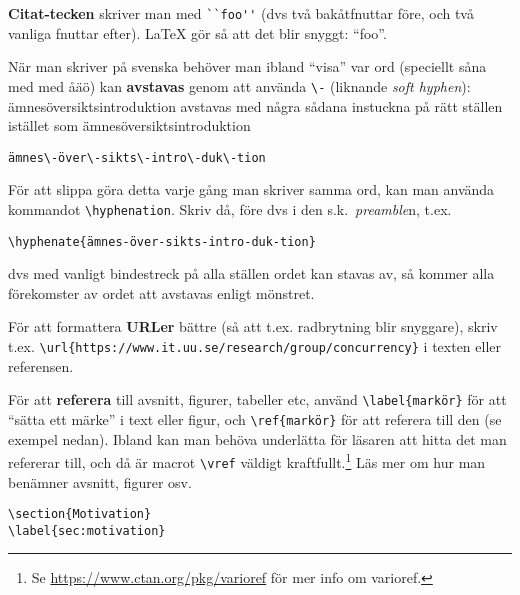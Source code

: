 \textbf{Citat-tecken} skriver man med \verb|``foo''| (dvs två bakåtfnuttar före, och två vanliga fnuttar efter). LaTeX gör så att det blir snyggt: ``foo''.

När man skriver på svenska behöver man ibland ``visa'' var ord (speciellt såna med med åäö) kan \textbf{avstavas} genom att använda \verb|\-| (liknande \textit{soft hyphen}): ämnesöversiktsintroduktion avstavas med några sådana instuckna på rätt ställen istället som ämnes\-över\-sikts\-intro\-duk\-tion

\begin{verbatim}
ämnes\-över\-sikts\-intro\-duk\-tion
\end{verbatim}

För att slippa göra detta varje gång man skriver samma ord, kan man använda kommandot \verb|\hyphenation|. Skriv då, före \verb|| dvs i den s.k.~\emph{preamble}n, t.ex.
\begin{verbatim}
\hyphenate{ämnes-över-sikts-intro-duk-tion}
\end{verbatim}
dvs med vanligt bindestreck på alla ställen ordet kan stavas av, så kommer alla förekomster av ordet att avstavas enligt mönstret.

För att formattera \textbf{URLer} bättre (så att t.ex. radbrytning blir snyggare), skriv t.ex. \verb|\url{https://www.it.uu.se/research/group/concurrency}| i texten eller referensen.

\label{sec:referera-labels}
För att \textbf{referera} till avsnitt, figurer, tabeller etc, använd \verb|\label{markör}| för att ``sätta ett märke'' i text eller figur, och \verb|\ref{markör}| för att referera till den (se exempel nedan).
Ibland kan man behöva underlätta för läsaren att hitta det man refererar till, och då är macrot \verb|\vref| väldigt kraftfullt.\footnote{Se \url{https://www.ctan.org/pkg/varioref} för mer info om varioref.}
Läs mer  om hur man benämner avsnitt, figurer osv.
\begin{verbatim}
\section{Motivation}
\label{sec:motivation}
\end{verbatim}

